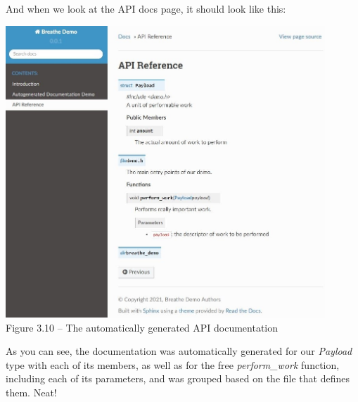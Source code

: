 And when we look at the API docs page, it should look like this:

\begin{center}
\includegraphics[width=0.9\textwidth]{content/1/chapter3/images/10.jpg}\\
Figure 3.10 – The automatically generated API documentation
\end{center}


As you can see, the documentation was automatically generated for our \textit{Payload} type with each of its members, as well as for the free \textit{perform\_work} function, including each of its parameters, and was grouped based on the file that defines them. Neat!

























